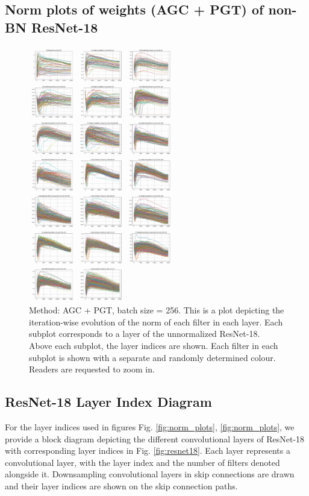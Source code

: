 \documentclass[runningheads]{llncs}
\begin{document}
\subsection{Norm plots of weights (AGC + PGT) of non-BN ResNet-18}
\label{sec:plots4}
\begin{figure}[ht]
\centering
\includegraphics[width=0.57\textwidth]{compressed/agc_pgt-w_norm}
\caption{ Method: AGC + PGT, batch size = 256. This is a plot depicting the
iteration-wise evolution of the norm of each filter in each layer. Each subplot
corresponds to a layer of the unnormalized ResNet-18. Above each subplot, the layer
indices are shown. Each filter in each subplot is shown with a separate and randomly
determined colour.
Readers are requested to zoom in. }
\end{figure}



\clearpage

\subsection{ResNet-18 Layer Index Diagram}
\label{sec:r18_layers}

For the layer indices used in figures Fig. \ref{fig:norm_plots}, \ref{fig:norm_plots},
we provide a block diagram depicting the different convolutional layers of ResNet-18
with corresponding layer indices in Fig. \ref{fig:resnet18}. Each layer represents a
convolutional layer, with the layer index and the number of filters denoted alongside
it. Downsampling convolutional layers in skip connections are drawn and their layer
indices are shown on the skip connection paths.
\end{document}
